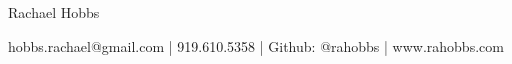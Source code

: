 
\begin{center}
\begin{Large}
Rachael Hobbs
\end{Large}
\begin{normalsize}
hobbs.rachael@gmail.com | 919.610.5358 | Github: @rahobbs | www.rahobbs.com
\end{normalsize}
\end{center}

